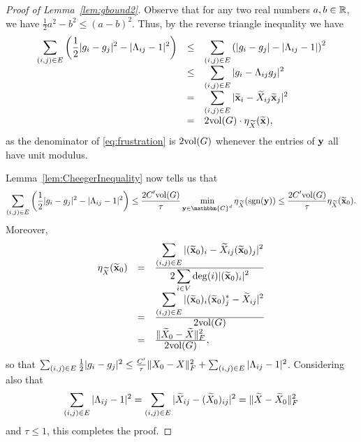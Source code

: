 \begin{proof}[Proof of Lemma~\ref{lem:gbound2}]
Observe that for any two real numbers $a, b \in \mathbb{R}$, we have $\frac{1}{2} a^2 - b^2 \le (a - b)^2$. Thus, by the reverse triangle inequality we have 
\[\everymath{\displaystyle}\begin{array}{rcl}%
\sum_{(i, j) \in E}  \left(\frac{1}{2} |g_i - g_j|^2 - |\Lambda_{ij} - 1|^2\right) & \le & \sum_{(i, j) \in E}  \left( |g_i - g_j| - |\Lambda_{ij} - 1|\right)^2 \\%
 & \le & \sum_{(i, j) \in E}  |g_i - \Lambda_{ij}g_j|^2 \\%
& = & \sum_{(i, j) \in E}  |\tx_i - \tX_{ij} \tx_j |^2 \\%
& = & 2 \vol(G) \cdot \eta_{\tX}(\tx),%
\end{array}\]%
as the denominator of \eqref{eq:frustration} is $2\mathrm{vol}(G)$ whenever the entries of ${\bf y}$ all have unit modulus.

Lemma~\ref{lem:CheegerInequality} now tells us that 
\[ \sum_{(i, j) \in E}  \left(\frac{1}{2} |g_i - g_j|^2 - |\Lambda_{ij} - 1|^2\right) \le \bigfrac{2 C' \vol(G)}{\tau} \min_{{\bf y} \in \mathbbm{C}^d} \eta_{\tX}( \sgn({\bf y}) ) \le \bigfrac{2C' \vol(G)}{\tau} \eta_{\tX}(\tx_0).\] 
Moreover,%
$$\begin{array}{rcl}%
\eta_{\tX}(\tx_0) & = & \bigfrac{\sum_{(i, j) \in E} |(\tx_0)_i - \tX_{ij} (\tx_0)_j |^2}{2 \sum_{i \in V} \deg(i) |(\tx_0)_i|^2} \\%
& = & \bigfrac{\sum_{(i, j) \in E} |(\tx_0)_i (\tx_0)^*_j - \tX_{ij}|^2}{2 \vol(G)} \\%
& = & \bigfrac{ \| \widetilde{\X}_0 - \tX \|_F^2}{2 \vol(G)},%
\end{array}$$%
so that $\sum_{(i, j) \in E} \frac{1}{2} |g_i - g_j|^2 \le \frac{C'}{\tau} \lVert X_0 - X \rVert^2_F + \sum_{(i, j) \in E} |\Lambda_{ij} - 1|^2$.  Considering also that $$\sum_{(i, j) \in E} |\Lambda_{ij} - 1|^2 = \sum_{(i, j) \in E} |\widetilde{X}_{ij} - (\widetilde{X}_0)_{ij}|^2 = \| \widetilde{X} - \widetilde{X}_0 \|_F^2$$ and $\tau \le 1$, this completes the proof.
\end{proof}

